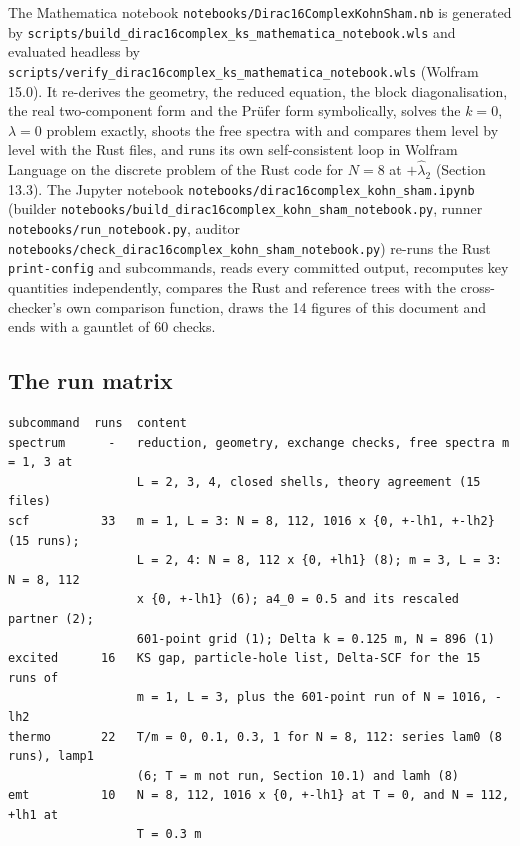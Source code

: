 \documentclass[11pt]{article}
\begin{document}
The Mathematica notebook \texttt{notebook\allowbreak{}s/Dirac1\allowbreak{}6Complex\allowbreak{}KohnSham\allowbreak{}.nb} is generated by \texttt{scripts/\allowbreak{}build\_di\allowbreak{}rac16com\allowbreak{}plex\_ks\_\allowbreak{}mathemat\allowbreak{}ica\_note\allowbreak{}book.wls} and evaluated headless by \texttt{scripts/\allowbreak{}verify\_d\allowbreak{}irac16co\allowbreak{}mplex\_ks\allowbreak{}\_mathema\allowbreak{}tica\_not\allowbreak{}ebook.wl\allowbreak{}s} (Wolfram 15.0). It re-derives the geometry, the reduced equation, the block diagonalisation, the real two-component form and the Prüfer form symbolically, solves the $k=0$, $\lambda=0$ problem exactly, shoots the free spectra with \texttt{} and compares them level by level with the Rust files, and runs its own self-consistent loop in Wolfram Language on the discrete problem of the Rust code for $N=8$ at $+\hat\lambda_2$ (Section 13.3). The Jupyter notebook \texttt{notebook\allowbreak{}s/dirac1\allowbreak{}6complex\allowbreak{}\_kohn\_sh\allowbreak{}am.ipynb} (builder \texttt{notebook\allowbreak{}s/build\_\allowbreak{}dirac16c\allowbreak{}omplex\_k\allowbreak{}ohn\_sham\allowbreak{}\_noteboo\allowbreak{}k.py}, runner \texttt{notebook\allowbreak{}s/run\_no\allowbreak{}tebook.p\allowbreak{}y}, auditor \texttt{notebook\allowbreak{}s/check\_\allowbreak{}dirac16c\allowbreak{}omplex\_k\allowbreak{}ohn\_sham\allowbreak{}\_noteboo\allowbreak{}k.py}) re-runs the Rust \texttt{print-co\allowbreak{}nfig} and \texttt{} subcommands, reads every committed output, recomputes key quantities independently, compares the Rust and reference trees with the cross-checker's own comparison function, draws the 14 figures of this document and ends with a gauntlet of 60 checks.

\subsection{The run matrix}

\begin{Verbatim}[fontsize=\small]
subcommand  runs  content
spectrum      -   reduction, geometry, exchange checks, free spectra m = 1, 3 at
                  L = 2, 3, 4, closed shells, theory agreement (15 files)
scf          33   m = 1, L = 3: N = 8, 112, 1016 x {0, +-lh1, +-lh2} (15 runs);
                  L = 2, 4: N = 8, 112 x {0, +lh1} (8); m = 3, L = 3: N = 8, 112
                  x {0, +-lh1} (6); a4_0 = 0.5 and its rescaled partner (2);
                  601-point grid (1); Delta k = 0.125 m, N = 896 (1)
excited      16   KS gap, particle-hole list, Delta-SCF for the 15 runs of
                  m = 1, L = 3, plus the 601-point run of N = 1016, -lh2
thermo       22   T/m = 0, 0.1, 0.3, 1 for N = 8, 112: series lam0 (8 runs), lamp1
                  (6; T = m not run, Section 10.1) and lamh (8)
emt          10   N = 8, 112, 1016 x {0, +-lh1} at T = 0, and N = 112, +lh1 at
                  T = 0.3 m
\end{Verbatim}
\end{document}
